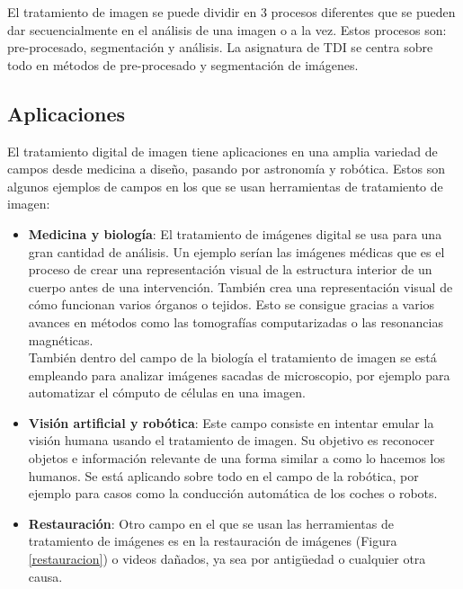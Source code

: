 El tratamiento de imagen se puede dividir en 3 procesos diferentes que se pueden dar secuencialmente en el análisis de una imagen o a la vez. Estos procesos son: pre-procesado, segmentación y análisis. La asignatura de TDI se centra sobre todo en métodos de pre-procesado y segmentación de imágenes.\\ 

\subsection{Aplicaciones}
El tratamiento digital de imagen tiene aplicaciones en una amplia variedad de campos desde medicina a diseño, pasando por astronomía y robótica.  Estos son algunos ejemplos de campos en los que se usan herramientas de tratamiento de imagen:
\begin{itemize}
\item \textbf{Medicina y biología}: El tratamiento de imágenes digital se usa para una gran cantidad de análisis. Un ejemplo serían las imágenes médicas que es el proceso de crear una representación visual de la estructura interior de un cuerpo antes de una intervención. También crea una representación visual de cómo funcionan varios órganos o tejidos. Esto se consigue gracias a varios avances en métodos como las tomografías computarizadas o las resonancias magnéticas.\\

También dentro del campo de la biología el tratamiento de imagen se está empleando para analizar imágenes sacadas de microscopio, por ejemplo para automatizar el cómputo de células en una imagen.\\

\item \textbf{Visión artificial y robótica}: Este campo consiste en intentar emular la visión humana usando el tratamiento de imagen. Su objetivo es reconocer objetos e información relevante de una forma similar a como lo hacemos los humanos. Se está aplicando sobre todo en el campo de la robótica, por ejemplo para casos como la conducción automática de los coches o robots.\\

\item \textbf{Restauración}: Otro campo en el que se usan las herramientas de tratamiento de imágenes es en la restauración de imágenes (Figura \ref{restauracion}) o videos dañados, ya sea por antigüedad o cualquier otra causa. \\


\end{itemize}
